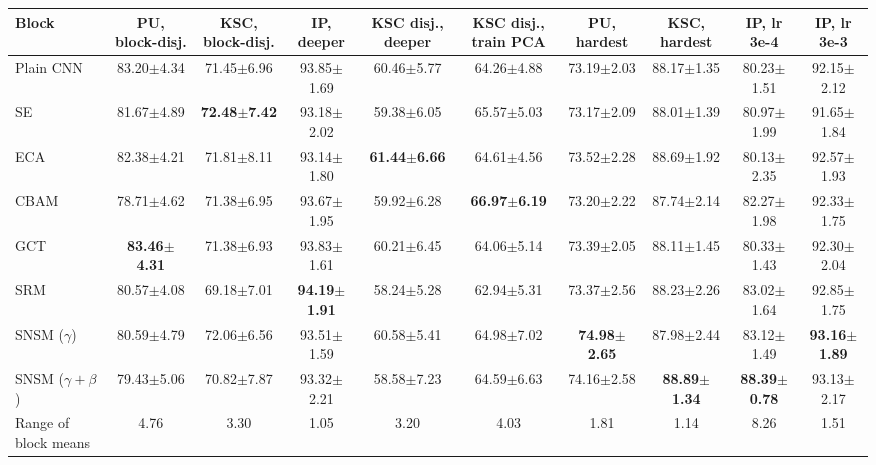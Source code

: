 \begin{tabular}{lccccccccc}
\toprule
Block & PU, block-disj. & KSC, block-disj. & IP, deeper & KSC disj., deeper & KSC disj., train PCA & PU, hardest & KSC, hardest & IP, lr 3e-4 & IP, lr 3e-3 \\
\midrule
Plain CNN & 83.20$\pm$4.34 & 71.45$\pm$6.96 & 93.85$\pm$1.69 & 60.46$\pm$5.77 & 64.26$\pm$4.88 & 73.19$\pm$2.03 & 88.17$\pm$1.35 & 80.23$\pm$1.51 & 92.15$\pm$2.12 \\
SE & 81.67$\pm$4.89 & \textbf{72.48$\pm$7.42} & 93.18$\pm$2.02 & 59.38$\pm$6.05 & 65.57$\pm$5.03 & 73.17$\pm$2.09 & 88.01$\pm$1.39 & 80.97$\pm$1.99 & 91.65$\pm$1.84 \\
ECA & 82.38$\pm$4.21 & 71.81$\pm$8.11 & 93.14$\pm$1.80 & \textbf{61.44$\pm$6.66} & 64.61$\pm$4.56 & 73.52$\pm$2.28 & 88.69$\pm$1.92 & 80.13$\pm$2.35 & 92.57$\pm$1.93 \\
CBAM & 78.71$\pm$4.62 & 71.38$\pm$6.95 & 93.67$\pm$1.95 & 59.92$\pm$6.28 & \textbf{66.97$\pm$6.19} & 73.20$\pm$2.22 & 87.74$\pm$2.14 & 82.27$\pm$1.98 & 92.33$\pm$1.75 \\
GCT & \textbf{83.46$\pm$4.31} & 71.38$\pm$6.93 & 93.83$\pm$1.61 & 60.21$\pm$6.45 & 64.06$\pm$5.14 & 73.39$\pm$2.05 & 88.11$\pm$1.45 & 80.33$\pm$1.43 & 92.30$\pm$2.04 \\
SRM & 80.57$\pm$4.08 & 69.18$\pm$7.01 & \textbf{94.19$\pm$1.91} & 58.24$\pm$5.28 & 62.94$\pm$5.31 & 73.37$\pm$2.56 & 88.23$\pm$2.26 & 83.02$\pm$1.64 & 92.85$\pm$1.75 \\
SNSM ($\gamma$) & 80.59$\pm$4.79 & 72.06$\pm$6.56 & 93.51$\pm$1.59 & 60.58$\pm$5.41 & 64.98$\pm$7.02 & \textbf{74.98$\pm$2.65} & 87.98$\pm$2.44 & 83.12$\pm$1.49 & \textbf{93.16$\pm$1.89} \\
SNSM ($\gamma{+}\beta$) & 79.43$\pm$5.06 & 70.82$\pm$7.87 & 93.32$\pm$2.21 & 58.58$\pm$7.23 & 64.59$\pm$6.63 & 74.16$\pm$2.58 & \textbf{88.89$\pm$1.34} & \textbf{88.39$\pm$0.78} & 93.13$\pm$2.17 \\
\midrule
Range of block means & 4.76 & 3.30 & 1.05 & 3.20 & 4.03 & 1.81 & 1.14 & 8.26 & 1.51 \\
\bottomrule
\end{tabular}
